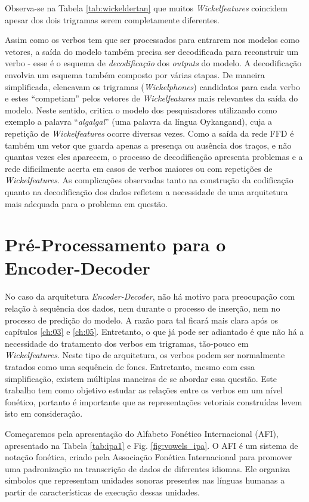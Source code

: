 Observa-se na Tabela \ref{tab:wickeldertan} que muitos \textit{Wickelfeatures} coincidem apesar dos dois trigramas serem completamente diferentes. 

Assim como os verbos tem que ser processados para entrarem nos modelos como vetores, a saída do modelo também precisa ser decodificada para reconstruir um verbo -  esse é o esquema de \textit{decodificação} dos \textit{outputs} do modelo. A decodificação envolvia um esquema também composto por várias etapas. De maneira simplificada, \cite{rumelhart:1986} elencavam os trigramas (\textit{Wickelphones}) candidatos para cada verbo e estes “competiam” pelos vetores de \textit{Wickelfeatures} mais relevantes da saída do modelo. Neste sentido, \cite{Pinker:1999} critica o modelo dos pesquisadores utilizando como exemplo a palavra “\textit{algalgal}” (uma palavra da língua Oykangand), cuja a repetição de \textit{Wickelfeatures} ocorre diversas vezes. Como a saída da rede FFD é também um vetor que guarda apenas a presença ou ausência dos traços, e não quantas vezes eles aparecem, o processo de decodificação apresenta problemas e a rede dificilmente acerta em casos de verbos maiores ou com repetições de \textit{Wickelfeatures}. As complicações observadas tanto na construção da codificação quanto na decodificação dos dados refletem a necessidade de uma arquitetura mais adequada para o problema em questão.

\section{Pré-Processamento para o Encoder-Decoder}

No caso da arquitetura \textit{Encoder-Decoder}, não há motivo para preocupação com relação à sequência dos dados, nem durante o processo de inserção, nem no processo de predição do modelo. A razão para tal ficará mais clara após os capítulos \ref{ch:03} e \ref{ch:05}. Entretanto, o que já pode ser adiantado é que não há a necessidade do tratamento dos verbos em trigramas, tão-pouco em \textit{Wickelfeatures}. Neste tipo de arquitetura, os verbos podem ser normalmente tratados como uma sequência de fones. Entretanto, mesmo com essa simplificação, existem múltiplas maneiras de se abordar essa questão. Este trabalho tem como objetivo estudar as relações entre os verbos em um nível fonético, portanto é importante que as representações vetoriais construídas levem isto em consideração.

Começaremos pela apresentação do Alfabeto Fonético Internacional (AFI), apresentado na Tabela \ref{tab:ipa1} e Fig. \ref{fig:vowels_ipa}. O AFI é um sistema de notação fonética, criado pela Associação Fonética Internacional para promover uma padronização na transcrição de dados de diferentes idiomas. Ele organiza símbolos que representam unidades sonoras presentes nas línguas humanas a partir de características de execução dessas unidades. 


